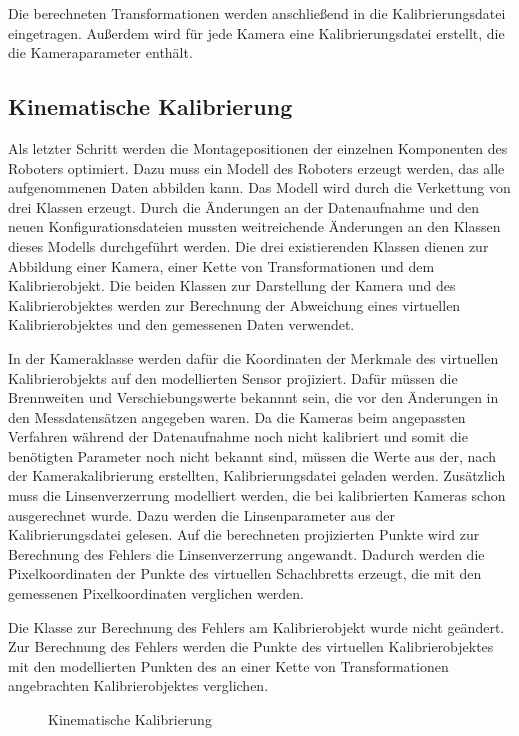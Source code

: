 Die berechneten Transformationen werden anschließend in die Kalibrierungsdatei
eingetragen. Außerdem wird für jede Kamera eine Kalibrierungsdatei erstellt,
die die Kameraparameter enthält.


\subsection{Kinematische Kalibrierung}
\label{sub:Kinematische Kalibrierung_umsetzung}

Als letzter Schritt werden die Montagepositionen der einzelnen Komponenten des 
Roboters optimiert. Dazu muss ein Modell des Roboters erzeugt werden, das 
alle aufgenommenen Daten abbilden kann. Das Modell wird durch die Verkettung
von drei Klassen erzeugt. Durch die Änderungen an der Datenaufnahme
und den neuen Konfigurationsdateien mussten weitreichende Änderungen an den 
Klassen dieses Modells durchgeführt werden. Die drei existierenden Klassen 
dienen zur Abbildung einer Kamera, einer Kette von Transformationen und
dem Kalibrierobjekt. Die beiden Klassen zur Darstellung der Kamera und des 
Kalibrierobjektes werden zur Berechnung der Abweichung eines virtuellen
Kalibrierobjektes und den gemessenen Daten verwendet.

In der Kameraklasse werden dafür die Koordinaten der Merkmale des virtuellen 
Kalibrierobjekts auf den modellierten Sensor projiziert. Dafür müssen die
Brennweiten und Verschiebungswerte bekannnt sein, die vor den Änderungen in den
Messdatensätzen angegeben waren. Da die Kameras beim angepassten Verfahren 
während der Datenaufnahme noch nicht kalibriert und somit die benötigten 
Parameter noch nicht bekannt sind, müssen die Werte aus der, nach der
Kamerakalibrierung erstellten, Kalibrierungsdatei geladen werden. 
Zusätzlich muss die Linsenverzerrung modelliert werden, die bei kalibrierten 
Kameras schon ausgerechnet wurde. Dazu werden die Linsenparameter aus der 
Kalibrierungsdatei gelesen. Auf die berechneten projizierten Punkte wird zur 
Berechnung des Fehlers die Linsenverzerrung angewandt. Dadurch werden
die Pixelkoordinaten der Punkte des virtuellen Schachbretts erzeugt, die mit 
den gemessenen Pixelkoordinaten verglichen werden.

Die Klasse zur Berechnung des Fehlers am Kalibrierobjekt wurde nicht geändert.
Zur Berechnung des Fehlers werden die Punkte des virtuellen Kalibrierobjektes
mit den modellierten Punkten des an einer Kette von Transformationen angebrachten
Kalibrierobjektes verglichen.

\begin{figure}[htpb]
  \centering

    \label{fig:run_calibration}
    \caption{Kinematische Kalibrierung}
\end{figure}

